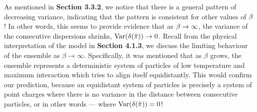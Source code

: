 As mentioned in \textbf{Section 3.3.2}, we notice that there is a general pattern of decreasing variance, indicating that the pattern is consistent for other values of $\beta$! In other words, this seems to provide evidence that as $\beta \to \infty$, the variance of the consecutive dispersions shrinks, $\text{Var}(\delta({\tilde{\pi}})) \to 0$. Recall from the physical interpretation of the model in \textbf{Section 4.1.3}, we discuss the limiting behaviour of the ensemble as $\beta \to \infty$. Specifically, it was mentioned that as $\beta$ grows, the ensemble represents a deterministic system of particles of low temperature and maximum interaction which tries to align itself equidistantly. This would confirm our prediction, because an equidistant system of particles is precisely a system of point charges where there is no variance in the distance between consecutive particles, or in other words --- where $\text{Var}(\delta({\tilde{\pi}})) = 0$!
